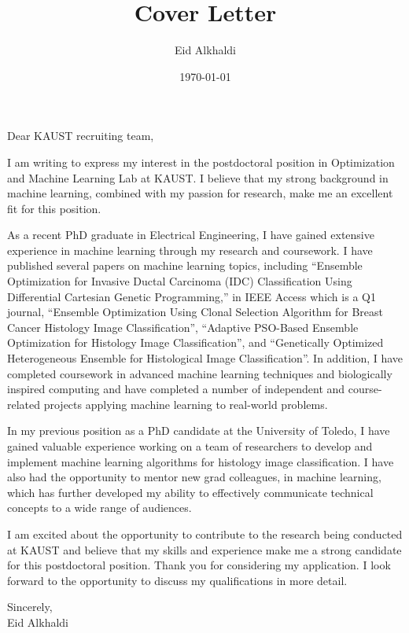 \documentclass[11pt]{article}
\author{Eid Alkhaldi}
\date{\today}
\title{Cover Letter}
\begin{document}
\maketitle
\noindent
Dear KAUST recruiting team,
\indent

I am writing to express my interest in the postdoctoral position in Optimization and Machine Learning Lab at KAUST. I believe that my strong background in machine learning, combined with my passion for research, make me an excellent fit for this position.

As a recent PhD graduate in Electrical Engineering, I have gained extensive experience in machine learning through my research and coursework. I have published several papers on machine learning topics, including “Ensemble Optimization for Invasive Ductal Carcinoma
(IDC) Classification Using Differential Cartesian Genetic Programming,” in IEEE Access which is a Q1 journal, “Ensemble Optimization Using Clonal Selection Algorithm
for Breast Cancer Histology Image Classification”, “Adaptive PSO-Based Ensemble Optimization for Histology Image Classification”, and “Genetically Optimized Heterogeneous Ensemble for Histological Image Classification”. In addition, I have completed coursework in advanced machine learning techniques and biologically inspired computing and have completed a number of independent and course-related projects applying machine learning to real-world problems.

In my previous position as a PhD candidate at the University of Toledo, I have gained valuable experience working on a team of researchers to develop and implement machine learning algorithms for histology image classification. I have also had the opportunity to mentor new grad colleagues, in machine learning, which has further developed my ability to effectively communicate technical concepts to a wide range of audiences.

I am excited about the opportunity to contribute to the research being conducted at KAUST and believe that my skills and experience make me a strong candidate for this postdoctoral position. Thank you for considering my application. I look forward to the opportunity to discuss my qualifications in more detail.

\noindent
Sincerely,\\
Eid Alkhaldi
\end{document}
